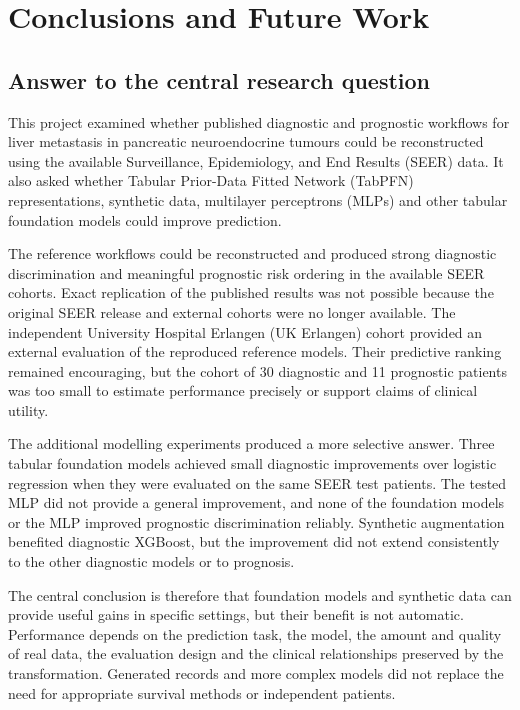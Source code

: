 \section{Conclusions and Future Work}
\label{sec:conclusion}

\subsection{Answer to the central research question}

This project examined whether published diagnostic and prognostic workflows for
liver metastasis in pancreatic neuroendocrine tumours could be reconstructed
using the available Surveillance, Epidemiology, and End Results (SEER) data. It
also asked whether Tabular Prior-Data Fitted Network (TabPFN) representations,
synthetic data, multilayer perceptrons (MLPs) and other tabular foundation models
could improve prediction.

The reference workflows could be reconstructed and produced strong diagnostic
discrimination and meaningful prognostic risk ordering in the available SEER
cohorts. Exact replication of the published results was not possible because
the original SEER release and external cohorts were no longer available. The
independent University Hospital Erlangen (UK Erlangen) cohort provided an
external evaluation of the reproduced reference models. Their predictive
ranking remained encouraging, but the cohort of 30 diagnostic and 11
prognostic patients was too small to estimate performance precisely or support
claims of clinical utility.

The additional modelling experiments produced a more selective answer. Three
tabular foundation models achieved small diagnostic improvements over logistic
regression when they were evaluated on the same SEER test patients. The tested
MLP did not provide a general improvement, and none of the foundation models or
the MLP improved prognostic discrimination reliably. Synthetic augmentation
benefited diagnostic XGBoost, but the improvement did not extend consistently
to the other diagnostic models or to prognosis.

The central conclusion is therefore that foundation models and synthetic data
can provide useful gains in specific settings, but their benefit is not
automatic. Performance depends on the prediction task, the model, the amount
and quality of real data, the evaluation design and the clinical relationships
preserved by the transformation. Generated records and more complex models did
not replace the need for appropriate survival methods or independent patients.

